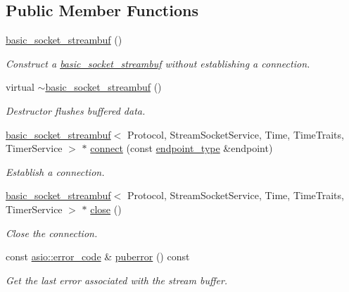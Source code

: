 \subsection*{Public Member Functions}
\begin{DoxyCompactItemize}
\item 
\hyperlink{classasio_1_1basic__socket__streambuf_a8b6bcf4f53efd55ce5d89cefcdc85673}{basic\+\_\+socket\+\_\+streambuf} ()
\begin{DoxyCompactList}\small\item\em Construct a \hyperlink{classasio_1_1basic__socket__streambuf}{basic\+\_\+socket\+\_\+streambuf} without establishing a connection. \end{DoxyCompactList}\item 
virtual \hyperlink{classasio_1_1basic__socket__streambuf_af54bd614b6e93484977d0d66122c84f2}{$\sim$basic\+\_\+socket\+\_\+streambuf} ()
\begin{DoxyCompactList}\small\item\em Destructor flushes buffered data. \end{DoxyCompactList}\item 
\hyperlink{classasio_1_1basic__socket__streambuf}{basic\+\_\+socket\+\_\+streambuf}$<$ Protocol, Stream\+Socket\+Service, Time, Time\+Traits, Timer\+Service $>$ $\ast$ \hyperlink{classasio_1_1basic__socket__streambuf_a8fdf31f6ba721f53a4cb9dce3632a421}{connect} (const \hyperlink{classasio_1_1basic__socket__streambuf_a89b46b0c3c210f854b355799821fd5db}{endpoint\+\_\+type} \&endpoint)
\begin{DoxyCompactList}\small\item\em Establish a connection. \end{DoxyCompactList}\item 
\hyperlink{classasio_1_1basic__socket__streambuf}{basic\+\_\+socket\+\_\+streambuf}$<$ Protocol, Stream\+Socket\+Service, Time, Time\+Traits, Timer\+Service $>$ $\ast$ \hyperlink{classasio_1_1basic__socket__streambuf_aea77d2c5dae49855e68fa527408d6296}{close} ()
\begin{DoxyCompactList}\small\item\em Close the connection. \end{DoxyCompactList}\item 
const \hyperlink{classasio_1_1error__code}{asio\+::error\+\_\+code} \& \hyperlink{classasio_1_1basic__socket__streambuf_a226ba99670e19a831d0fc93672a9bca4}{puberror} () const 
\begin{DoxyCompactList}\small\item\em Get the last error associated with the stream buffer. \end{DoxyCompactList}\item 

\end{DoxyCompactItemize}
